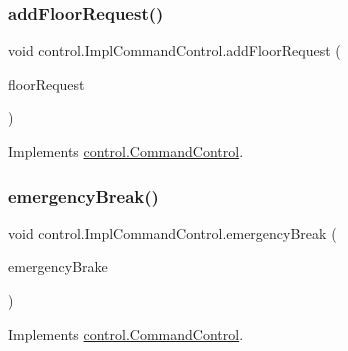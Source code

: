 \mbox{\label{classcontrol_1_1_impl_command_control_a992b195b4521cba044f235fa35f6a9b2}} 
\subsubsection{\texorpdfstring{addFloorRequest()}{addFloorRequest()}}
{\footnotesize\ttfamily void control.\+Impl\+Command\+Control.\+add\+Floor\+Request (\begin{DoxyParamCaption}\item[{\mbox{\hyperlink{classcontrol_1_1command_1_1_floor_request}{Floor\+Request}}}]{floor\+Request }\end{DoxyParamCaption})}



Implements \mbox{\hyperlink{interfacecontrol_1_1_command_control_addb1fea724cbd015456ac62a1dcf556d}{control.\+Command\+Control}}.

\mbox{\label{classcontrol_1_1_impl_command_control_a1a3e2202d967016c70f6c7e2105fc4c7}} 
\subsubsection{\texorpdfstring{emergencyBreak()}{emergencyBreak()}}
{\footnotesize\ttfamily void control.\+Impl\+Command\+Control.\+emergency\+Break (\begin{DoxyParamCaption}\item[{\mbox{\hyperlink{classcontrol_1_1command_1_1_emergency_brake}{Emergency\+Brake}}}]{emergency\+Brake }\end{DoxyParamCaption})}



Implements \mbox{\hyperlink{interfacecontrol_1_1_command_control_a9a32457770712105c8ceffab1c05b95a}{control.\+Command\+Control}}.

\mbox{\label{classcontrol_1_1_impl_command_control_abba34b3a552395174ddc686b4e3136dd}} 
